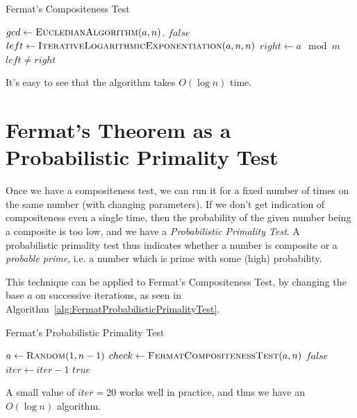 \documentclass[11pt]{report}
\begin{document}
\begin{algorithm}
\caption{Fermat's Compositeness Test}
\label{alg:FermatCompositenessTest}
\begin{algorithmic}
\State $gcd \gets \Call{EucledianAlgorithm}{a, n}$.
	\State \Return $false$
\EndIf
\State $left \gets \Call{IterativeLogarithmicExponentiation}{a,n,n}$
\State $right \gets a \mod m$
\State \Return $left \neq right$
\EndProcedure
\end{algorithmic}
\end{algorithm}

It's easy to see that the algorithm takes $O(\log n)$ time.

\section{Fermat's Theorem as a Probabilistic Primality Test}

Once we have a compositeness test, we can run it for a fixed number of times on the same number (with changing parameters). If we don't get indication of compositeness even a single time, then the probability of the given number being a composite is too low, and we have a \emph{Probabilistic Primality Test}. A probabilistic primality test thus indicates whether a number is composite or a \emph{probable prime}, i.e. a number which is prime with some (high) probability.

This technique can be applied to Fermat's Compositeness Test, by changing the base $a$ on successive iterations, as seen in Algorithm~\ref{alg:FermatProbabilisticPrimalityTest}.

\begin{algorithm}
\caption{Fermat's Probabilistic Primality Test}
\label{alg:FermatProbabilisticPrimalityTest}
\begin{algorithmic}
 
	\State $a \gets \Call{Random}{1,n-1}$ 
	\State $check \gets \Call{FermatCompositenessTest}{a,n}$
		\State \Return $false$ 
	\EndIf
	\State $iter \gets iter-1$
\EndWhile
\State \Return $true$ 
\EndProcedure
\end{algorithmic}
\end{algorithm}

A small value of $iter = 20$ works well in practice, and thus we have an $O(\log n)$ algorithm.
\end{document}

